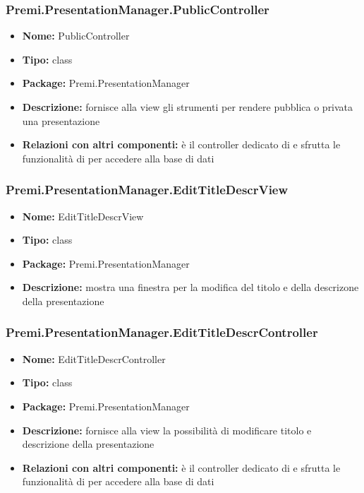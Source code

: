 \subsubsection{Premi.PresentationManager.PublicController}
\begin{itemize}
  \item \textbf{Nome:} PublicController
  \item \textbf{Tipo:} class
  \item \textbf{Package:} Premi.PresentationManager
  \item \textbf{Descrizione:} fornisce alla view gli strumenti per rendere pubblica o privata una presentazione
  \item \textbf{Relazioni con altri componenti:} è il controller dedicato di   e sfrutta le funzionalità di  per accedere alla base di dati
\end{itemize}
\subsubsection{Premi.PresentationManager.EditTitleDescrView}
\begin{itemize}
  \item \textbf{Nome:} EditTitleDescrView
  \item \textbf{Tipo:} class
  \item \textbf{Package:} Premi.PresentationManager
  \item \textbf{Descrizione:} mostra una finestra per la modifica del titolo e della descrizone della presentazione
\end{itemize}
\subsubsection{Premi.PresentationManager.EditTitleDescrController}
\begin{itemize}
  \item \textbf{Nome:} EditTitleDescrController
  \item \textbf{Tipo:} class
  \item \textbf{Package:} Premi.PresentationManager
  \item \textbf{Descrizione:} fornisce alla view la possibilità di modificare titolo e descrizione della presentazione
  \item \textbf{Relazioni con altri componenti:} è il controller dedicato di   e sfrutta le funzionalità di  per accedere alla base di dati
\end{itemize}
